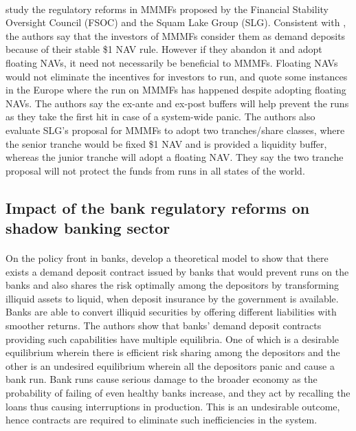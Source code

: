 \documentclass[11pt]{article}
\begin{document}
\paragraph{} \cite{adrian2016shadow} study the regulatory reforms in MMMFs proposed by the Financial Stability Oversight Council (FSOC) and the Squam Lake Group (SLG). Consistent with \cite{hanson2015evaluation}, the authors say that the investors of MMMFs consider them as demand deposits because of their stable \$1 NAV rule. However if they abandon it and adopt floating NAVs, it need not necessarily be beneficial to MMMFs. Floating NAVs would not eliminate the incentives for investors to run, and quote some instances in the Europe where the run on MMMFs has happened despite adopting floating NAVs. The authors say the ex-ante and ex-post buffers will help prevent the runs as they take the first hit in case of a system-wide panic. The authors also evaluate SLG's proposal for MMMFs to adopt two tranches/share classes, where the senior tranche would be fixed \$1 NAV and is provided a liquidity buffer, whereas the junior tranche will adopt a floating NAV. They say the two tranche proposal will not protect the funds from runs in all states of the world.  

\subsection{Impact of the bank regulatory reforms on shadow banking sector}
\paragraph{} On the policy front in banks, \cite{diamond1983bank} develop a theoretical model to show that there exists a demand deposit contract issued by banks that would prevent runs on the banks and also shares the risk optimally among the depositors by transforming illiquid assets to liquid, when deposit insurance by the government is available. Banks are able to convert illiquid securities by offering different liabilities with smoother returns.  The authors show that banks' demand deposit contracts providing such capabilities have multiple equilibria. One of which is a desirable equilibrium wherein there is efficient risk sharing among the depositors and the other is an undesired equilibrium wherein all the depositors panic and cause a bank run. Bank runs cause serious damage to the broader economy as the probability of failing of even healthy banks increase, and they act by recalling the loans thus causing interruptions in production. This is an undesirable outcome, hence contracts are required to eliminate such inefficiencies in the system.
\end{document}
